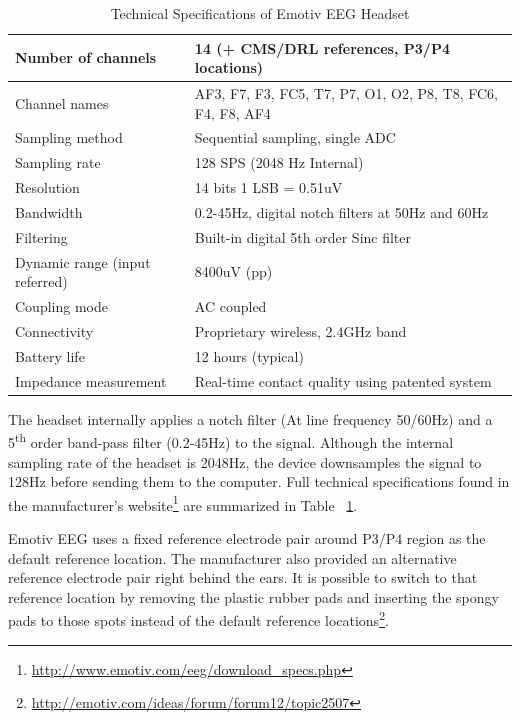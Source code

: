 \documentclass[12pt]{article}
\numberwithin{equation}{section}
\numberwithin{figure}{section}
\numberwithin{table}{section}
\begin{document}
\par{
    \begin{table}
        \footnotesize
        \centering
        \caption{Technical Specifications of Emotiv EEG Headset}
        \begin{tabular}{ll}
            \hline
            Number of channels & 14 (+ CMS/DRL references, P3/P4 locations) \\ \hline
            Channel names & AF3, F7, F3, FC5, T7, P7, O1, O2, P8, T8, FC6, F4, F8, AF4 \\ \hline
            Sampling method & Sequential sampling, single ADC \\ \hline
            Sampling rate & 128 SPS (2048 Hz Internal) \\ \hline
            Resolution & 14 bits 1 LSB = 0.51uV \\ \hline
            Bandwidth & 0.2-45Hz, digital notch filters at 50Hz and 60Hz \\ \hline
            Filtering & Built-in digital 5th order Sinc filter \\ \hline
            Dynamic range (input referred) & 8400uV (pp) \\ \hline
            Coupling mode & AC coupled \\ \hline
            Connectivity & Proprietary wireless, 2.4GHz band \\ \hline
            Battery life & 12 hours (typical) \\ \hline
            Impedance measurement & Real-time contact quality using patented system \\ \hline
        \end{tabular}
        \label{table:emotiv_eeg_specs}
    \end{table}
    The headset internally applies a
    notch filter (At line frequency 50/60Hz) and a 5\textsuperscript{th} order band-pass filter (0.2-45Hz)
    to the signal. Although the internal sampling rate of the headset is 2048Hz, the device
    downsamples the signal to 128Hz before sending them to the computer. Full technical specifications found in the
    manufacturer's website\footnote{\url{http://www.emotiv.com/eeg/download_specs.php}} are summarized in Table ~\ref{table:emotiv_eeg_specs}.
}
\par{
    Emotiv EEG uses a fixed reference electrode pair around P3/P4 region as the default
    reference location. The manufacturer also provided an alternative reference electrode
    pair right behind the ears. It is possible to switch to that reference location
    by removing the plastic rubber pads and inserting the spongy pads to those spots
    instead of the default reference locations\footnote{\url{http://emotiv.com/ideas/forum/forum12/topic2507}}.
}
\end{document}
